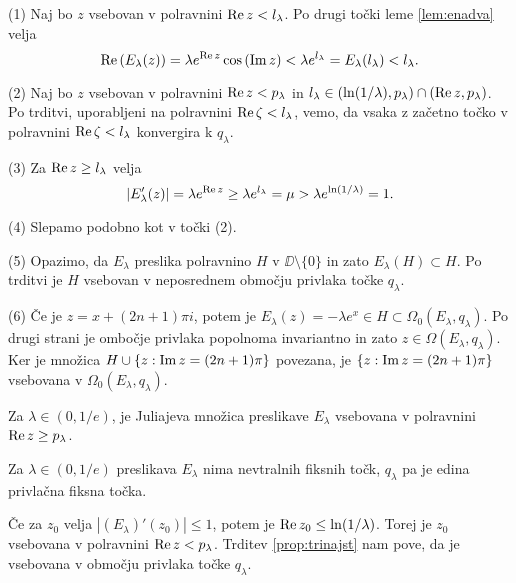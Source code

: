 \begin{dokaz}
    (1) Naj bo \(z\) vsebovan v polravnini \(\operatorname{Re} z < l_\lambda\). Po drugi točki leme \ref{lem:enadva} velja
    \[\operatorname{Re} \left( E_\lambda (z) \right) = \lambda e^{\operatorname{Re} z} \cos \left( \operatorname{Im} z \right) < \lambda e^{l_\lambda} = E_\lambda (l_\lambda) < l_\lambda.\]

    (2) Naj bo \(z\) vsebovan v polravnini \(\operatorname{Re} z < p_\lambda\) in \(l_\lambda \in (\ln (1 / \lambda), p_\lambda) \cap (\operatorname{Re} z, p_\lambda)\). Po  trditvi, uporabljeni na polravnini \(\operatorname{Re} \zeta < l_\lambda\), vemo, da vsaka z začetno točko v polravnini \(\operatorname{Re} \zeta < l_\lambda\) konvergira k \(q_\lambda\).

    (3) Za \(\operatorname{Re} z \geq l_\lambda\) velja
    \[|E_\lambda' (z)| = \lambda e^{\operatorname{Re} z} \geq \lambda e^{l_\lambda} = \mu > \lambda e^{\ln (1 / \lambda)} = 1.\]

    (4) Slepamo podobno kot v točki (2).

    (5) Opazimo, da \(E_\lambda\) preslika polravnino \(H\) v \(\DD \setminus \{0\}\) in zato \(E_\lambda (H) \subset H\). Po  trditvi je \(H\) vsebovan v neposrednem območju privlaka točke \(q_\lambda\).

    (6) Če je \(z = x + (2n + 1) \pi i\), potem je \(E_\lambda (z) = - \lambda e^x \in H \subset \Omega_0 (E_\lambda, q_\lambda)\). Po drugi strani je ombočje privlaka popolnoma invariantno in zato \(z \in \Omega (E_\lambda, q_\lambda)\). Ker je množica \(H \cup \left\{ z : \operatorname{Im} z = (2n + 1) \pi \right\}\) povezana, je \(\left\{ z : \operatorname{Im} z = (2n + 1) \pi \right\}\) vsebovana v \(\Omega_0 (E_\lambda, q_\lambda)\).
\end{dokaz}

\begin{posledica} \label{cor:jul-e}
    Za \(\lambda \in (0, 1/e)\), je Juliajeva množica preslikave \(E_\lambda\) vsebovana v polravnini \(\operatorname{Re} z \geq p_\lambda\).
\end{posledica}

\begin{posledica}
    Za \(\lambda \in (0, 1/e)\) preslikava \(E_\lambda\) nima nevtralnih fiksnih točk, \(q_\lambda\) pa je edina privlačna fiksna točka.
\end{posledica}

\begin{dokaz}
    Če za \(z_0\) velja \(|(E_\lambda)' (z_0)| \leq 1\), potem je \(\operatorname{Re} z_0 \leq \ln (1 / \lambda)\). Torej je \(z_0\) vsebovana v polravnini \(\operatorname{Re} z < p_\lambda\). Trditev \ref{prop:trinajst} nam pove, da je vsebovana v območju privlaka točke \(q_\lambda\).
\end{dokaz}

